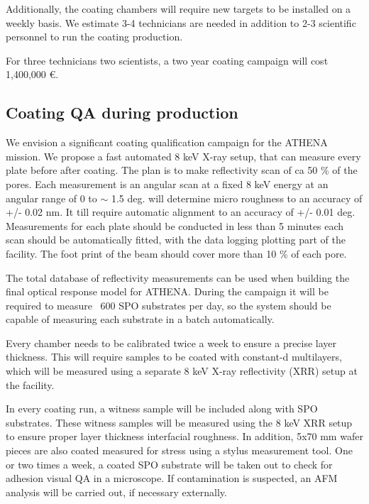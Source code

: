 Additionally, the coating chambers will require new targets to be installed on a weekly basis. We estimate 3-4 technicians are needed in addition to 2-3 scientific personnel to run the coating production.

For three technicians two scientists, a two year coating campaign will cost 1,400,000 \euro.


\subsection{Coating QA during production}\label{qualification}
We envision a significant coating qualification campaign for the ATHENA mission. We propose a fast automated 8 keV X-ray setup, that can measure every plate before after coating. The plan is to make reflectivity scan of ca 50 \% of the pores.  Each measurement is an angular scan  at a fixed 8 keV energy at an angular range of 0 to $\sim$ 1.5 deg. will determine micro roughness to an accuracy of +/- 0.02 nm. It till require automatic alignment to an accuracy of +/- 0.01 deg. Measurements for each plate should be conducted in less than 5 minutes each scan should be automatically fitted, with the data logging plotting part of the facility. The foot print of the beam should cover more than 10 \% of each pore.

The total database of reflectivity measurements can be used when building the final optical response model for ATHENA. During the campaign it will be required to measure ~600 SPO substrates per day, so the system should be capable of measuring each substrate in a batch automatically.

Every chamber needs to be calibrated twice a week to ensure a precise layer thickness. This will require samples to be coated with constant-d multilayers, which will be measured using a separate 8 keV X-ray reflectivity (XRR) setup at the facility.

In every coating run, a witness sample will be included along with SPO substrates. These witness samples will be measured using the 8 keV XRR setup to ensure proper layer thickness interfacial roughness. In addition, 5x70 mm wafer pieces are also coated measured for stress using a stylus measurement tool. One or two times a week, a coated SPO substrate will be taken out to check for adhesion visual QA in a microscope. If contamination is suspected, an AFM analysis will be carried out, if necessary externally.

